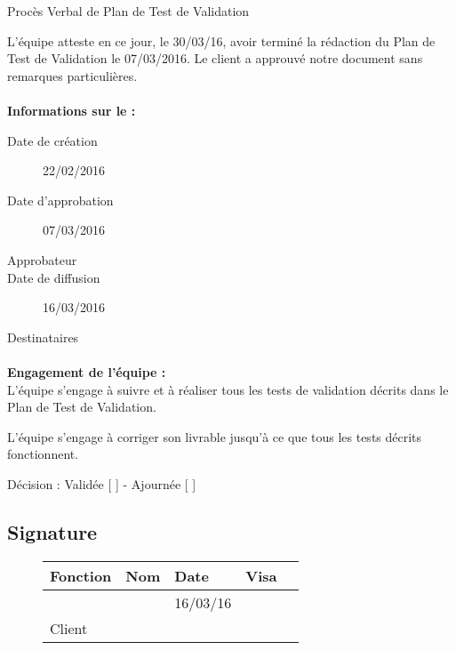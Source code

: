 \documentclass[asi, sansVersion]{picInsa}
\begin{document}
 
 \begin{center}
  \LARGE{}
    Procès Verbal de Plan de Test de Validation\\
 \end{center}
 
 \normalsize{}
 
L'équipe \nomEquipe{} atteste en ce jour, le 30/03/16, avoir terminé la rédaction du Plan de Test de Validation le 07/03/2016.
Le client a approuvé notre document sans remarques particulières.


\paragraph{}
\textbf{Informations sur le \PTVCourt :}

\begin{description}
  \item[Date de création]22/02/2016
  \item[Date d'approbation]07/03/2016
  \item[Approbateur]\nomClient
  \item[Date de diffusion]16/03/2016
  \item[Destinataires]\nomEquipe
\end{description}

\paragraph{}
\textbf{Engagement de l'équipe :}\\


L'équipe \nomEquipe{} s'engage à suivre et à réaliser tous les tests de validation décrits dans le Plan de Test de Validation.


L'équipe \nomEquipe{} s'engage à corriger son livrable jusqu'à ce que tous les tests décrits fonctionnent.


\begin{center}
Décision : Validée [ \checkmark{} ] - Ajournée [ ]
\end{center}

\subsection*{Signature}
\begin{figure}[H]
		\centering
		\begin{tabularx}{17cm}{|p{4cm}|X|X|X|X|}
		\hline
		\rowcolor[gray]{0.85} Fonction & Nom & Date & Visa \\
		\hline
		\CP{} & \Sergi{} & 16/03/16 & \\
		\hline
		Client & \nomClient & & \\
		\hline
		\end{tabularx}
\end{figure}
\end{document}
